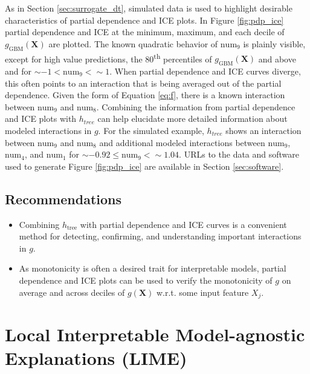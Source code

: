 \documentclass[11pt]{asaproc}
\begin{document}
As in Section \ref{sec:surrogate_dt}, simulated data is used to highlight desirable characteristics of partial dependence and ICE plots. In Figure \ref{fig:pdp_ice} partial dependence and ICE at the minimum, maximum, and each decile of $g_{\text{GBM}}(\mathbf{X})$ are plotted. The known quadratic behavior of $\text{num}_9$ is plainly visible, except for high value predictions, the 80\textsuperscript{th} percentiles of $g_{\text{GBM}}(\mathbf{X})$ and above and for $\sim-1 < \text{num}_9 < \sim1$. When partial dependence and ICE curves diverge, this often points to an interaction that is being averaged out of the partial dependence. Given the form of Equation \ref{eq:f}, there is a known interaction between $\text{num}_9$ and $\text{num}_8$. Combining the information from partial dependence and ICE plots with $h_{tree}$ can help elucidate more detailed information about modeled interactions in $g$. For the simulated example, $h_{tree}$ shows an interaction between $\text{num}_9$ and $\text{num}_8$ and additional modeled interactions between $\text{num}_9$, $\text{num}_4$, and $\text{num}_1$ for $\sim -0.92 \le \text{num}_9 <  \sim 1.04.$ URLs to the data and software used to generate Figure \ref{fig:pdp_ice} are available in Section \ref{sec:software}.

\subsection{Recommendations}

\begin{itemize}

\item Combining $h_{\text{tree}}$ with partial dependence and ICE curves is a convenient method for detecting, confirming, and understanding important interactions in $g$.

\item As monotonicity is often a desired trait for interpretable models, partial dependence and ICE plots can be used to verify the monotonicity of $g$ on average and across deciles of $g(\mathbf{X})$ w.r.t. some input feature $X_j$.

\end{itemize}

\section{Local Interpretable Model-agnostic Explanations (LIME)}
\label{sec:lime}
\end{document}
